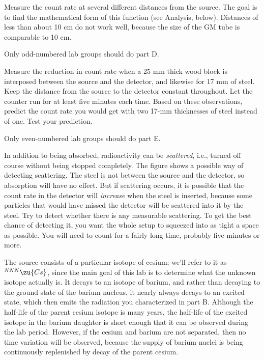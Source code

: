 
Measure the count rate at several different distances from the source.
The goal is to find the mathematical form of this function (see Analysis, below).
Distances of less than about 10 cm do not work well, because the size of the GM tube
is comparable to 10 cm.


Only odd-numbered lab groups should do part D.

Measure the reduction in count rate when a 25 mm thick wood block is 
interposed between the source and the detector, and likewise for 17 mm of steel.
Keep the distance from the source to the detector constant throughout.
Let the counter run for at least five minutes each time.
Based on these observations, predict the count rate you would
get with two 17-mm thicknesses of steel instead of one. Test your prediction.


Only even-numbered lab groups should do part E.


In addition to being absorbed, radioactivity can be \emph{scattered}, i.e., turned off
course without being stopped completely. The figure shows a possible way of detecting
scattering. The steel is not between the source and the detector, so absorption will
have no effect. But if scattering occurs, it is possible that the count rate in the
detector will \emph{increase} when the steel is inserted, because some particles that
would have missed the detector will be scattered into it by the steel. Try to detect
whether there is any measurable scattering. To get the best chance of detecting it,
you want the whole setup to squeezed into as tight a space as possible. You will need
to count for a fairly long time, probably five minutes or more.


\newcommand{\ces}{$^{NNN}\zu{Cs}$}

The source consists of a particular isotope of cesium; we'll refer to it as \ces, since the main
goal of this lab is to determine what the unknown isotope actually is. It decays to an isotope
of barium, and rather than decaying to the ground state of the barium nucleus, it nearly always
decays to an excited state, which then emits the radiation you characterized in part B.
Although the half-life of the parent cesium isotope is many years, the half-life of the
excited isotope in the barium daughter is short enough that it can be observed during the lab
period. However, if the cesium and barium are not separated, then no time variation will
be observed, because the supply of barium nuclei is being continuously replenished by
decay of the parent cesium.

